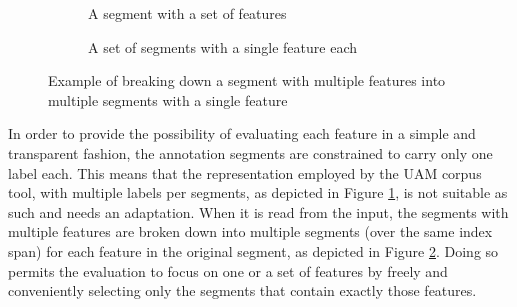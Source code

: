     \begin{figure}[!h]
        \centering
        \begin{subfigure}[b]{0.47\textwidth}
            \centering
            \caption{A segment with a set of features}
            \label{fig:segment-multiple}
        \end{subfigure}
        \begin{subfigure}[b]{0.47\textwidth}
            \centering
            \caption{A set of segments with a single feature each}
            \label{fig:segment-simple}
        \end{subfigure}
        \caption{Example of breaking down a segment with multiple features into multiple segments with a single feature}
        \label{fig:segment-breackdown}
    \end{figure}

    In order to provide the possibility of evaluating each feature in a simple and transparent fashion, the annotation segments are constrained to carry only one label each. This means that the representation employed by the UAM corpus tool, with multiple labels per segments, as depicted in Figure \ref{fig:segment-multiple}, is not suitable as such and needs an adaptation. When it is read from the input, the segments with multiple features are broken down into multiple segments (over the same index span) for each feature in the original segment, as depicted in Figure \ref{fig:segment-simple}. Doing so permits the evaluation to focus on one or a set of features by freely and conveniently selecting only the segments that contain exactly those features.
    
